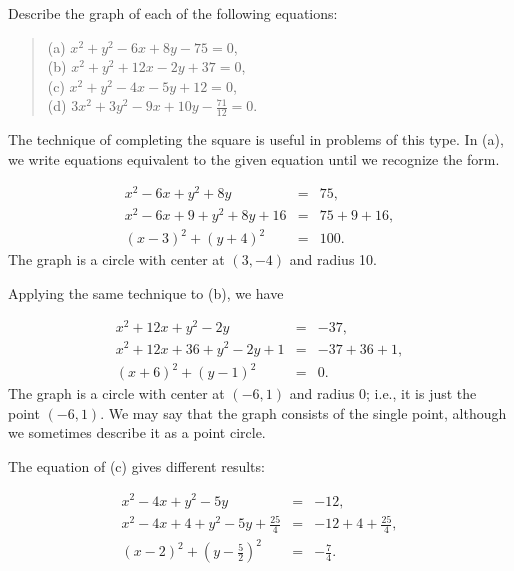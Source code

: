 \begin{example}
Describe the graph of each of the following equations:

\begin{quote}
\begin{description}
\item[(a) $x^2 + y^2 - 6x + 8y - 75 = 0$, ]
\item[(b) $x^2 + y^2 + 12x - 2y + 37 = 0$, ]
\item[(c) $x^2+y^2 - 4x- 5y+ 12 = 0$, ]
\item[(d) $3x^2 + 3y^2 - 9x + 10y - \frac{71}{12} = 0$.]
\end{description}
\end{quote}

The technique of completing the square is useful in problems of this type. In (a), we write equations equivalent to the given equation until we recognize the form.

\begin{eqnarray*}
               x^2 - 6x + y^2 + 8y &=& 75, \\
 x^2 - 6x + 9 + y^2 + 8y + 16 &=& 75 + 9 + 16, \\
             (x - 3)^2 + (y + 4)^2 &=& 100.
\end{eqnarray*}
\noindent The graph is a circle with center at $(3, - 4)$ and radius 10. 

Applying the same technique to (b), we have

\begin{eqnarray*}
              x^2 + 12x + y^2 - 2y &=& -37, \\
x^2 + 12x + 36 + y^2 - 2y + 1 &=& -37 + 36 + 1, \\
               (x + 6)^2 + (y - 1)^2 &=& 0.
\end{eqnarray*}
\noindent The graph is a circle with center at $(- 6, 1)$ and radius 0; i.e., it is just the point $(- 6, 1)$. We may say that the graph consists of the single point, although we sometimes describe it as a point circle.

The equation of (c) gives different results:

\begin{eqnarray*}
                            x^2 - 4x + y^2 - 5y &=& - 12, \\
x^2 - 4x + 4 + y^2 - 5y + \frac{25}{4} &=& - 12 + 4 + \frac{25}{4}, \\
               (x-2)^2 + (y - \frac{5}{2})^2 &=& -\frac{7}{4}.
\end{eqnarray*}


\end{example}
